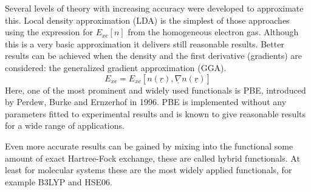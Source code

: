 \documentclass[11pt,DIV=13,BCOR=5mm,a4paper,headinclude]{scrbook}
\renewcommand{\vec}[1]{\underline{#1}}
\begin{document}
Several levels of theory with increasing accuracy were developed to approximate this.
Local density approximation (LDA) is the simplest of those approaches using the expression for $E_{xc}[n]$ from the homogeneous electron gas.
Although this is a very basic approximation it delivers still reasonable results.
Better results can be achieved when the density and the first derivative (gradients) are considered: the generalized gradient approximation (GGA).
\begin{equation}
  E_{xc}=E_{xc}[n(\vec{r}),\vec{\nabla} n(\vec{r})]
\end{equation}
Here, one of the most prominent and widely used functionals is PBE, introduced by Perdew, Burke and Ernzerhof in 1996\cite{Perdew96a,erratum}.
PBE is implemented without any parameters fitted to experimental results and is known to give reasonable results for a wide range of applications.


Even more accurate results can be gained by mixing into the functional some amount of exact Hartree-Fock exchange, these are called hybrid functionals.
At least for molecular systems these are the most widely applied functionals, for example B3LYP\cite{B3LYP1,B3LYP2} and HSE06\cite{HSE06}.
\end{document}
